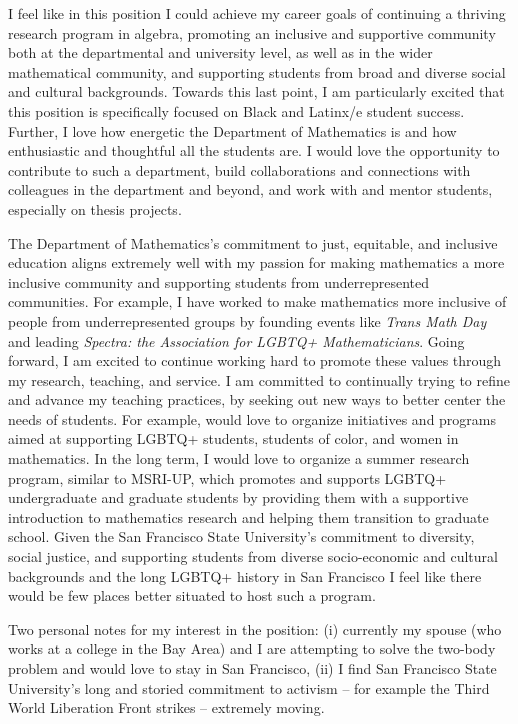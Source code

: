 \documentclass[11pt]{article}
\begin{document}
I feel like in this position I could achieve my career goals of continuing a thriving research program in algebra, promoting an inclusive and supportive community both at the departmental and university level, as well as in the wider mathematical community, and supporting students from broad and diverse social and cultural backgrounds. Towards this last point, I am particularly excited that this position is specifically focused on Black and Latinx/e student success. Further, I love how energetic the Department of Mathematics is and how enthusiastic and thoughtful all the students are. I would love the opportunity to contribute to such a department, build collaborations and connections with colleagues in the department and beyond, and work with and mentor students, especially on thesis projects. 


The Department of Mathematics's commitment to just, equitable, and inclusive education aligns extremely well with my passion for making mathematics a more inclusive community and supporting students from underrepresented communities. For example, I have worked to make mathematics more inclusive of people from underrepresented groups by founding events like \textit{Trans Math Day} and leading \textit{Spectra: the Association for LGBTQ+ Mathematicians}. Going forward, I am excited to continue working hard to promote these values through my research, teaching, and service. I am committed to continually trying to refine and advance my teaching practices, by seeking out new ways to better center the needs of students. For example, would love to organize initiatives and programs aimed at supporting LGBTQ+ students, students of color, and women in mathematics. In the long term, I would love to organize a summer research program, similar to MSRI-UP, which promotes and supports LGBTQ+ undergraduate and graduate students by providing them with a supportive introduction to mathematics research and helping them transition to graduate school. Given the San Francisco State University's commitment to diversity, social justice, and supporting students from diverse socio-economic and cultural backgrounds and the long LGBTQ+ history in San Francisco I feel like there would be few places better situated to host such a program. 

Two personal notes for my interest in the position: (i) currently my spouse (who works at a college in the Bay Area) and I are attempting to solve the two-body problem and would love to stay in San Francisco, (ii) I find San Francisco State University's long and storied commitment to activism -- for example the Third World Liberation Front strikes -- extremely moving. 
\end{document}
